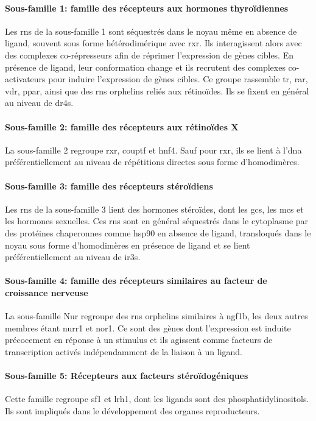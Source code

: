 \documentclass[../main.tex]{subfiles}
\begin{document}
\paragraph{Sous-famille 1: famille des récepteurs aux hormones thyroïdiennes}
Les \glspl{rn} de la sous-famille 1 sont séquestrés dans le noyau même en absence de ligand, souvent sous forme hétérodimérique avec \gls{rxr}.
Ils interagissent alors avec des complexes co-répresseurs afin de réprimer l'expression de gènes cibles.
En présence de ligand, leur conformation change et ils recrutent des complexes co-activateurs pour induire l'expression de gènes cibles.
Ce groupe rassemble \gls{tr}, \gls{rar}, \gls{vdr}, \gls{ppar}, ainsi que des \glspl{rn} orphelins reliés aux rétinoïdes. Ils se fixent en général au niveau de \glspl{dr4}.

\paragraph{Sous-famille 2: famille des récepteurs aux rétinoïdes X}
La sous-famille 2 regroupe \gls{rxr}, \gls{couptf} et \gls{hnf4}.
Sauf pour \gls{rxr}, ils se lient à l'\gls{dna} préférentiellement au niveau de répétitions directes sous forme d'homodimères.

\paragraph{Sous-famille 3: famille des récepteurs stéroïdiens}
Les \glspl{rn} de la sous-famille 3 lient des hormones stéroïdes, dont les \glspl{gc}, les \glspl{mc} et les hormones sexuelles. Ces \glspl{rn} sont en général séquestrés dans le cytoplasme par des protéines chaperonnes comme \gls{hsp90} en absence de ligand, transloqués dans le noyau sous forme d'homodimères en présence de ligand et se lient préférentiellement au niveau de \glspl{ir3}.

\paragraph{Sous-famille 4: famille des récepteurs similaires au facteur de croissance nerveuse}
La sous-famille Nur regroupe des \glspl{rn} orphelins similaires à \gls{ngf1b}, les deux autres membres étant \gls{nurr1} et \gls{nor1}.
Ce sont des gènes dont l'expression est induite précocement en réponse à un stimulus et ils agissent comme facteurs de transcription activés indépendamment de la liaison à un ligand.

\paragraph{Sous-famille 5: Récepteurs aux facteurs stéroïdogéniques}
Cette famille regroupe \gls{sf1} et \gls{lrh1}, dont les ligands sont des phosphatidylinositols.
Ils sont impliqués dans le développement des organes reproducteurs.
\end{document}
